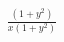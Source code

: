 \documentclass[preview]{standalone}
\begin{document}
\begin{align*}
\frac{\left( 1 + {y}^{2} \right)}{x \left( 1 + {y}^{2} \right)}
\end{align*}
\end{document}
